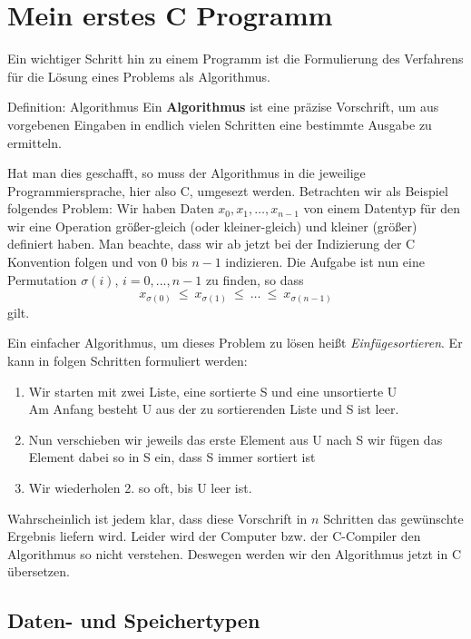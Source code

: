 \section{Mein erstes C Programm}

Ein wichtiger Schritt hin zu einem Programm ist die Formulierung des
Verfahrens für die Lösung eines Problems als Algorithmus.
\begin{myblock}{Definition: Algorithmus}
Ein \textbf{Algorithmus} ist eine präzise Vorschrift, um aus vorgebenen
Eingaben in endlich vielen Schritten eine bestimmte Ausgabe zu
ermitteln.
\end{myblock}

Hat man dies geschafft, so muss der Algorithmus in die jeweilige Programmiersprache, hier also C, umgesezt werden.
Betrachten wir als Beispiel folgendes Problem:
Wir haben Daten $x_0, x_1,\ldots,x_{n-1}$ von einem Datentyp für den wir eine Operation größer-gleich (oder kleiner-gleich) und kleiner (größer) definiert haben.
Man beachte, dass wir ab jetzt bei der Indizierung der C Konvention folgen und von $0$ bis $n-1$ indizieren.
Die Aufgabe ist nun eine Permutation $\sigma(i)$, $i=0,...,n-1$ zu finden, so dass
\[
x_{\sigma(0)}\ \leq\ x_{\sigma(1)}\ \leq\ \ldots\ \leq\ x_{\sigma(n-1)}
\]
gilt.

Ein einfacher Algorithmus, um dieses Problem zu lösen heißt \emph{Einfügesortieren}.
Er kann in folgen Schritten formuliert werden:
\begin{enumerate}
\item Wir starten mit zwei Liste, eine sortierte S und eine unsortierte U\\
  Am Anfang besteht U aus der zu sortierenden Liste und S ist leer.
\item Nun verschieben wir jeweils das erste Element aus U nach S
  wir fügen das Element dabei so in S ein, dass S immer sortiert ist
 \item Wir wiederholen 2. so oft, bis U leer ist.
\end{enumerate}
Wahrscheinlich ist jedem klar, dass diese Vorschrift in $n$ Schritten das gewünschte Ergebnis liefern wird.
Leider wird der Computer bzw. der C-Compiler den Algorithmus so nicht verstehen.
Deswegen werden wir den Algorithmus jetzt in C übersetzen.

\subsection{Daten- und Speichertypen}

